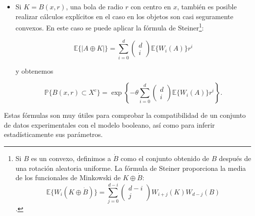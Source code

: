 \begin{itemize}
    M\'as a\'un, si suponemos que $A$ es isotr\'opico (es decir, que su funcional que pega es invariante bajo rotaciones) entonces la f\'ormula de Cauchy\footnote{Esta f\'ormula representa el valor medio de los funcionales de Minkowski. Estos funcionales surgen en el campo de la estereolog\'ia al estudiar funciones sobre los conjuntos convexos de $\mathbb{R}^d$. Es deseable que esta familia de funciones respete la convexidad, y los funcionales de Minkowski la generan. Est\'an definidas salvo alguna constante multiplicativa, y convencionalmente se utiliza por constante de normalizaci\'on el volumen de una esfera unitaria en $\mathbb{R}^d$, a saber \[\omega_d=\frac{\pi^{\frac{d}{2}}}{\Gamma(\frac{d}{2}+1)}.\] Los funcionales de Minkowski se denotan por $W_i$, donde $i$ se denomina el grado del funcional, y varios de ellos tienen interpretaciones muy sencillas. Por ejemplo $W_0(K)=|K|$, $W_1(K)=\frac{|\partial K|}{d}$, donde $|\partial K|$ denota al volumen $(d-1)$-dimensional de la frontera de $K$.} puede aplicarse y la f\'ormula anterior se simplifica a

\[\mathbb{P}\{[x,x+h]\subset X^c\}=qe^{-\theta|h|\frac{\omega_{d-1}}{d\omega_d}\mathbb{E}\{|\partial A|\}}.\]

Esta probabilidad se comporta como una funci\'on exponencial de m\'odulo $h$.

\item Si $K=B(x,r)$, una bola de radio $r$ con centro en $x$, tambi\'en es posible realizar c\'alculos expl\'icitos en el caso en los objetos son casi seguramente convexos. En este caso se puede aplicar la f\'ormula de Steiner\footnote{Si $B$ es un convexo, definimos a $\dot{B}$ como el conjunto obtenido de $B$ despu\'es de una rotaci\'on aleatoria uniforme. La f\'ormula de Steiner proporciona la media de los funcionales de Minkowski de $K\oplus\dot{B}$: \[\mathbb{E}\{W_i(K\oplus\dot{B})\}=\sum_{j=0}^{d-i}\left(\begin{array}{c}d-i\\j\end{array}\right)W_{i+j}(K)W_{d-j}(B)\].}:

    \[\mathbb{E}\{|A\oplus K|\}=\sum_{i=0}^d\left(\begin{array}{c}d\\i\end{array}\right)\mathbb{E}\{W_i(A)\}r^i\]

    y obtenemos

    \[\mathbb{P}\{B(x,r)\subset X^c\}=\exp\left\{-\theta\sum_{i=0}^d\left(\begin{array}{c}d\\i\end{array}\right)\mathbb{E}\{W_i(A)\}r^i\right\}.\]

\end{itemize}
\vspace{0.2in}
Estas f\'ormulas son muy \'utiles para comprobar la compatibilidad de un conjunto de datos experimentales con el modelo booleano, as\'i como para inferir estad\'isticamente sus par\'ametros.

